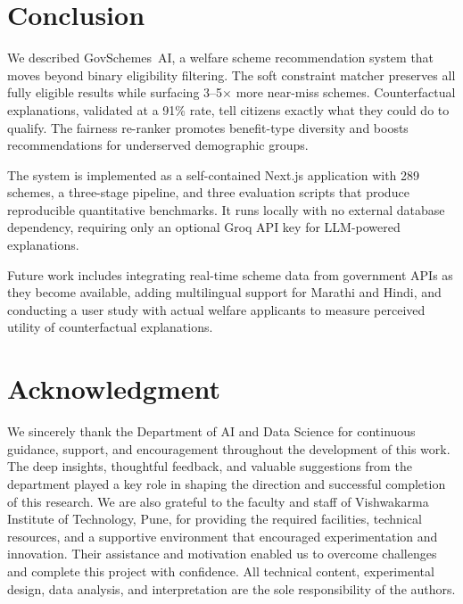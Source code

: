 \documentclass[conference]{IEEEtran}
\begin{document}
\section{Conclusion}

We described GovSchemes~AI, a welfare scheme recommendation system that moves beyond binary eligibility filtering. The soft constraint matcher preserves all fully eligible results while surfacing 3--5$\times$ more near-miss schemes. Counterfactual explanations, validated at a 91\% rate, tell citizens exactly what they could do to qualify. The fairness re-ranker promotes benefit-type diversity and boosts recommendations for underserved demographic groups.

The system is implemented as a self-contained Next.js application with 289 schemes, a three-stage pipeline, and three evaluation scripts that produce reproducible quantitative benchmarks. It runs locally with no external database dependency, requiring only an optional Groq API key for LLM-powered explanations.

Future work includes integrating real-time scheme data from government APIs as they become available, adding multilingual support for Marathi and Hindi, and conducting a user study with actual welfare applicants to measure perceived utility of counterfactual explanations.

\section*{Acknowledgment}

We sincerely thank the Department of AI and Data Science for continuous guidance, support, and encouragement throughout the development of this work. The deep insights, thoughtful feedback, and valuable suggestions from the department played a key role in shaping the direction and successful completion of this research. We are also grateful to the faculty and staff of Vishwakarma Institute of Technology, Pune, for providing the required facilities, technical resources, and a supportive environment that encouraged experimentation and innovation. Their assistance and motivation enabled us to overcome challenges and complete this project with confidence. All technical content, experimental design, data analysis, and interpretation are the sole responsibility of the authors.
\end{document}
